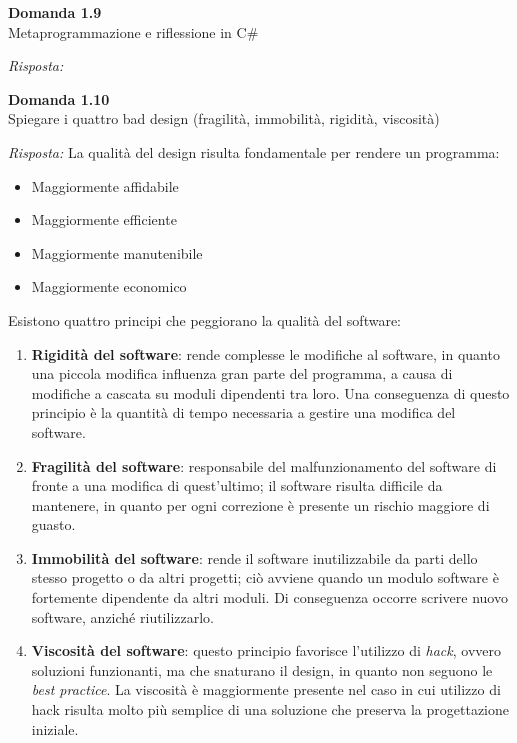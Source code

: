 \documentclass{article}
\newenvironment{problem}[2][Domanda]
    { \begin{mdframed}[backgroundcolor=gray!20] \textbf{#1 #2} \\}
    {  \end{mdframed}}
\newenvironment{solution}
    {\textit{Risposta:}}
    {}
\begin{document}
\begin{problem}{1.9}
Metaprogrammazione e riflessione in C\#
\end{problem}
\begin{solution}
\end{solution}


\begin{problem}{1.10}
Spiegare i quattro bad design (fragilità, immobilità, rigidità, viscosità)
\end{problem}
\begin{solution}
La qualità del design risulta fondamentale per rendere un programma:
\begin{itemize}
	\item Maggiormente affidabile
	\item Maggiormente efficiente
	\item Maggiormente manutenibile
	\item Maggiormente economico
\end{itemize}
Esistono quattro principi che peggiorano la qualità del software:
\begin{enumerate}
	\item \textbf{Rigidità del software}: rende complesse le modifiche al software, in quanto una piccola modifica influenza gran parte del programma, a causa di modifiche a cascata su moduli dipendenti tra loro.
	\newline Una conseguenza di questo principio è la quantità di tempo necessaria a gestire una modifica del software.
	\item \textbf{Fragilità del software}: responsabile del malfunzionamento del software di fronte a una modifica di quest'ultimo; il software risulta difficile da mantenere, in quanto per ogni correzione è presente un rischio maggiore di guasto.
	\item \textbf{Immobilità del software}: rende il software inutilizzabile da parti dello stesso progetto o da altri progetti; ciò avviene quando un modulo software è fortemente dipendente da altri moduli.
	\newline Di conseguenza occorre scrivere nuovo software, anziché riutilizzarlo.
	\item \textbf{Viscosità del software}: questo principio favorisce l'utilizzo di \textit{hack}, ovvero soluzioni funzionanti, ma che snaturano il design, in quanto non seguono le \textit{best practice}.
	\newline
	La viscosità è maggiormente presente nel caso in cui utilizzo di hack risulta molto più semplice di una soluzione che preserva la progettazione iniziale.

\end{enumerate}
\end{solution}
\end{document}
